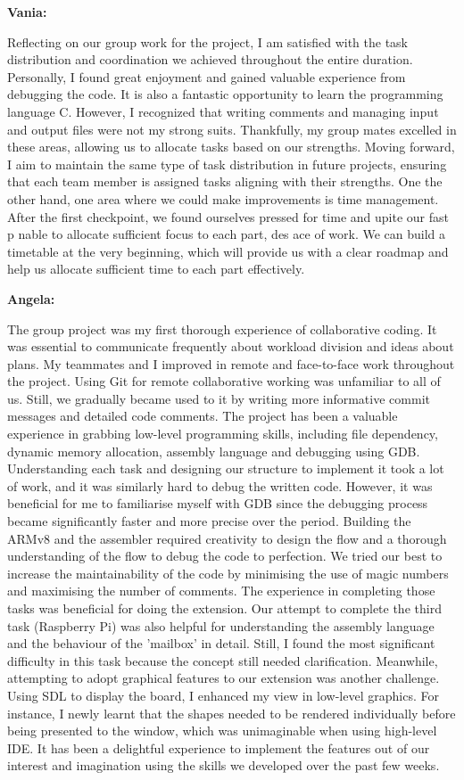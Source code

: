 \documentclass{article}
\begin{document}
\textbf{Vania:}

Reflecting on our group work for the project, I am satisfied with the task distribution and coordination we achieved throughout the entire duration. Personally, I found great enjoyment and gained valuable experience from debugging the code. It is also a fantastic opportunity to learn the programming language C. However, I recognized that writing comments and managing input and output files were not my strong suits. Thankfully, my group mates excelled in these areas, allowing us to allocate tasks based on our strengths. Moving forward, I aim to maintain the same type of task distribution in future projects, ensuring that each team member is assigned tasks aligning with their strengths. One the other hand, one area where we could make improvements is time management. After the first checkpoint, we found ourselves pressed for time and upite our fast p nable to allocate sufficient focus to each part, des ace of work. We can build a timetable at the very beginning, which will provide us with a clear roadmap and help us allocate sufficient time to each part effectively. 

\textbf{Angela:}

The group project was my first thorough experience of collaborative coding. It was essential to communicate frequently about workload division and ideas about plans. My teammates and I improved in remote and face-to-face work throughout the project. Using Git for remote collaborative working was unfamiliar to all of us. Still, we gradually became used to it by writing more informative commit messages and detailed code comments. The project has been a valuable experience in grabbing low-level programming skills, including file dependency, dynamic memory allocation, assembly language and debugging using GDB. Understanding each task and designing our structure to implement it took a lot of work, and it was similarly hard to debug the written code. However, it was beneficial for me to familiarise myself with GDB since the debugging process became significantly faster and more precise over the period. Building the ARMv8 and the assembler required creativity to design the flow and a thorough understanding of the flow to debug the code to perfection. We tried our best to increase the maintainability of the code by minimising the use of magic numbers and maximising the number of comments. The experience in completing those tasks was beneficial for doing the extension. Our attempt to complete the third task (Raspberry Pi) was also helpful for understanding the assembly language and the behaviour of the 'mailbox' in detail. Still, I found the most significant difficulty in this task because the concept still needed clarification. Meanwhile, attempting to adopt graphical features to our extension was another challenge. Using SDL to display the board, I enhanced my view in low-level graphics. For instance, I newly learnt that the shapes needed to be rendered individually before being presented to the window, which was unimaginable when using high-level IDE. It has been a delightful experience to implement the features out of our interest and imagination using the skills we developed over the past few weeks. 
\end{document}

